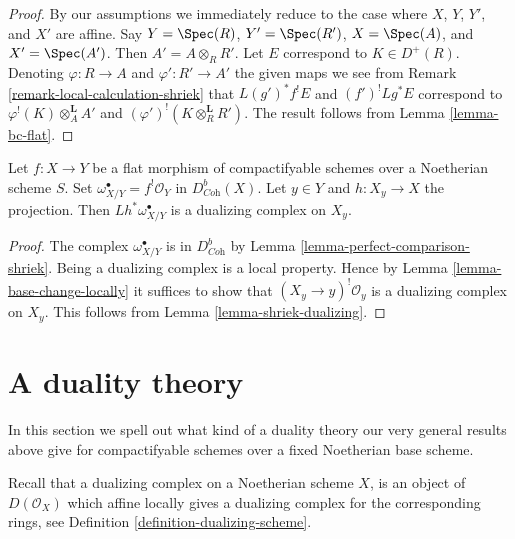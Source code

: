 \begin{proof}
By our assumptions we immediately reduce to the case where
$X$, $Y$, $Y'$, and $X'$ are affine.
Say $Y = \Spec(R)$, $Y' = \Spec(R')$, $X = \Spec(A)$, and $X' = \Spec(A')$.
Then $A' = A \otimes_R R'$. Let
$E$ correspond to $K \in D^+(R)$.
Denoting $\varphi : R \to A$ and $\varphi' : R' \to A'$
the given maps we see from
Remark \ref{remark-local-calculation-shriek}
that $L(g')^*f^!E$ and $(f')^!Lg^*E$ correspond to
$\varphi^!(K) \otimes_A^\mathbf{L} A'$ and
$(\varphi')^!(K \otimes_R^\mathbf{L} R')$.
The result follows from
Lemma \ref{lemma-bc-flat}.
\end{proof}

\begin{lemma}
\label{lemma-relative-dualizing-fibres}
Let $f : X \to Y$ be a flat morphism of compactifyable schemes over
a Noetherian scheme $S$. Set
$\omega_{X/Y}^\bullet = f^!\mathcal{O}_Y$ in $D^b_{\textit{Coh}}(X)$.
Let $y \in Y$ and $h : X_y \to X$ the projection.
Then $Lh^*\omega_{X/Y}^\bullet$ is a dualizing complex
on $X_y$.
\end{lemma}

\begin{proof}
The complex $\omega_{X/Y}^\bullet$ is in $D^b_{\textit{Coh}}$
by Lemma \ref{lemma-perfect-comparison-shriek}.
Being a dualizing complex is a local property.
Hence by Lemma \ref{lemma-base-change-locally}
it suffices to show that $(X_y \to y)^!\mathcal{O}_y$
is a dualizing complex on $X_y$.
This follows from Lemma \ref{lemma-shriek-dualizing}.
\end{proof}








\section{A duality theory}
\label{section-duality}

\noindent
In this section we spell out what kind of a duality theory
our very general results above give for compactifyable schemes
over a fixed Noetherian base scheme.

\medskip\noindent
Recall that a dualizing complex on a Noetherian scheme $X$, is an
object of $D(\mathcal{O}_X)$ which affine locally gives a dualizing
complex for the corresponding rings, see
Definition \ref{definition-dualizing-scheme}.

